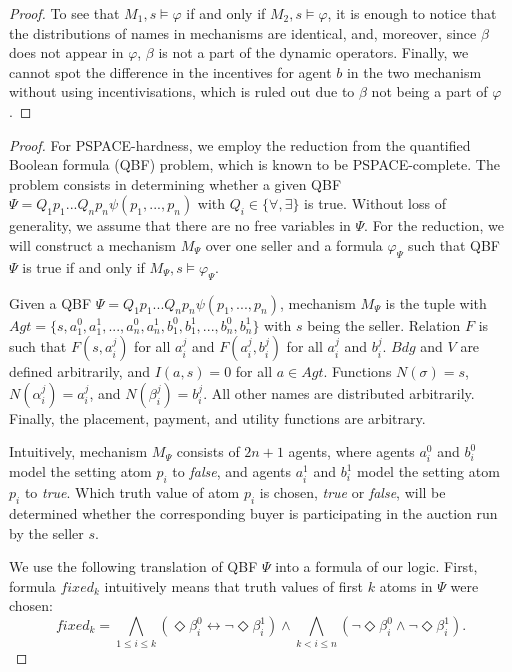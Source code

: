 \begin{proof}
To see that $M_1,s\models \varphi$ if and only if $M_2,s \models \varphi$, it is enough to notice that the distributions of names in mechanisms are identical, and, moreover, since $\beta$ does not appear in $\varphi$, $\beta$ is not a part of the dynamic operators. Finally, we cannot spot the difference in the incentives for agent $b$ in the two mechanism without using incentivisations, which is ruled out due to $\beta$ not being a part of $\varphi$. 
\end{proof}

\mcsl*
\begin{proof}
      For PSPACE-hardness, we employ the reduction from the quantified Boolean formula (QBF) problem, which is known to be PSPACE-complete. The problem consists in determining whether a given QBF $\Psi = Q_1 p_1 ... Q_n p_n \psi(p_1,...,p_n)$ with $Q_i \in \{\forall, \exists\}$ is true. Without loss of generality, we assume that there are no free variables in $\Psi$. For the reduction, we will construct a mechanism $M_\Psi$ over one seller and a formula $\varphi_\Psi$ such that QBF $\Psi$ is true if and only if $M_\Psi, s \models \varphi_\Psi$. 

    Given a QBF $\Psi = Q_1 p_1 ... Q_n p_n \psi(p_1,...,p_n)$, mechanism $M_\Psi$ is the tuple with $Agt = \{s, a_1^0,a_1^1, ..., a_n^0, a_n^1, b_1^0, b_1^1, ..., b_n^0, b_n^1\}$ with $s$ being the seller. Relation $F$ is such that $F(s, a_i^j)$ for all $a_i^j$ and $F(a_i^j,b_i^j)$ for all $a_i^j$ and $b_i^j$. $Bdg$ and $V$ are defined arbitrarily, and $I(a,s) = 0$ for all $a \in Agt$. Functions $N(\sigma) = s$, $N(\alpha_i^j) = a^j_i$,  and $N(\beta_i^j) = b^j_i$. All other names are distributed arbitrarily. Finally, the placement, payment, and utility functions are arbitrary. 
    
    Intuitively, mechanism $M_\Psi$ consists of $2n+1$ agents, where agents $a^0_i$ and $b^0_i$ model the setting atom $p_i$ to \textit{false}, and agents $a^1_i$ and $b^1_i$ model the setting atom $p_i$ to \textit{true}. Which truth value of atom $p_i$ is chosen, \textit{true} or \textit{false}, will be determined whether the corresponding buyer is participating in the auction run by the seller $s$.

    We use the following translation of QBF $\Psi$ into a formula of our logic. First, formula $fixed_k$ intuitively means that truth values of first $k$ atoms in $\Psi$ were chosen:
    $$fixed_k = \bigwedge_{1 \leqslant i \leqslant k} (\Diamond \beta_i^0 \leftrightarrow \lnot \Diamond \beta_i^1) \land \bigwedge_{k < i \leqslant n} (\lnot \Diamond \beta^0_i \land \lnot \Diamond \beta^1_i).$$


\end{proof}
